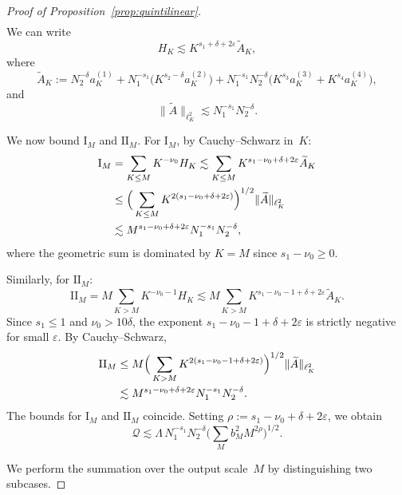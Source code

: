 \documentclass[10pt,a4paper]{amsart}
\renewcommand{\epsilon}{\varepsilon}
\begin{document}
\begin{proof}[Proof of Proposition~\ref{prop:quintilinear}]
\begin{align}
\end{align}
We can write
\begin{equation}\label{eq:HK-final}
	H_K \lesssim K^{s_1+\delta+2\epsilon} \widetilde{A}_K,
\end{equation}
where
\[
\widetilde{A}_K := N_2^{-\delta} a_K^{(1)} + N_1^{-s_1} \big(K^{s_2-\delta} a_K^{(2)}\big) + N_1^{-s_1} N_2^{-\delta} \big(K^{s_3} a_K^{(3)} + K^{s_4} a_K^{(4)}\big),
\]
and
\begin{equation}\label{eq:Atilde-norm}
	\|\widetilde{A}\|_{\ell_K^2} \lesssim N_1^{-s_1} N_2^{-\delta}.
\end{equation}

We now bound $\mathrm{I}_M$ and $\mathrm{II}_M$. For $\mathrm{I}_M$, by Cauchy--Schwarz in~$K$:
\begin{align}
	\mathrm{I}_M &= \sum_{K \le M} K^{-\nu_0} H_K \lesssim \sum_{K \le M} K^{s_1 - \nu_0 + \delta + 2\epsilon} \widetilde{A}_K \notag \\
	&\le \Big(\sum_{K \le M} K^{2(s_1 - \nu_0 + \delta + 2\epsilon)}\Big)^{1/2} \|\widetilde{A}\|_{\ell_{K}^2} \notag \\
	&\lesssim M^{s_1 - \nu_0 + \delta + 2\epsilon} N_1^{-s_1} N_2^{-\delta}, \label{eq:IM-bound}
\end{align}
where the geometric sum is dominated by $K=M$ since $s_1 - \nu_0 \geq 0$.

Similarly, for $\mathrm{II}_M$:
\[
\mathrm{II}_M = M \sum_{K > M} K^{-\nu_0-1} H_K \lesssim M \sum_{K > M} K^{s_1 - \nu_0 - 1 + \delta + 2\epsilon} \widetilde{A}_K.
\]
Since $s_1 \le 1$ and $\nu_0 > 10\delta$, the exponent $s_1 - \nu_0 - 1 + \delta + 2\epsilon$ is strictly negative for small $\epsilon$. By Cauchy--Schwarz,
\begin{align}
	\mathrm{II}_M &\le M \Big(\sum_{K > M} K^{2(s_1 - \nu_0 - 1 + \delta + 2\epsilon)}\Big)^{1/2} \|\widetilde{A}\|_{\ell_{K}^2} \notag \\
	&\lesssim M^{s_1 - \nu_0 + \delta + 2\epsilon} N_1^{-s_1} N_2^{-\delta}. \label{eq:IIM-bound}
\end{align}
The bounds for $\mathrm{I}_M$ and $\mathrm{II}_M$ coincide. Setting $\rho := s_1 - \nu_0 + \delta + 2\epsilon$, we obtain
\begin{equation}\label{eq:Q-intermediate}
	\mathcal{Q} \lesssim \Lambda\, N_1^{-s_1} N_2^{-\delta} \Big(\sum_M b_M^2 M^{2\rho}\Big)^{1/2}.
\end{equation}

We perform the summation over the output scale~$M$ by distinguishing two subcases.


\end{proof}
\end{document}
